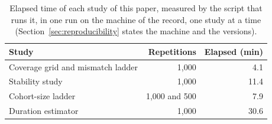 \begin{table}[htbp]
\centering
\small
\caption{Elapsed time of each study of this paper, measured by the script that runs it, in one run on the machine of the record, one study at a time (Section~\ref{sec:reproducibility} states the machine and the versions).}
\label{tab:runtimes}
\begin{tabular}{lrr}
\toprule
Study & Repetitions & Elapsed (min) \\
\midrule
Coverage grid and mismatch ladder & 1,000 & 4.1 \\
Stability study & 1,000 & 11.4 \\
Cohort-size ladder & 1,000 and 500 & 7.9 \\
Duration estimator & 1,000 & 30.6 \\
\bottomrule
\end{tabular}
\end{table}
